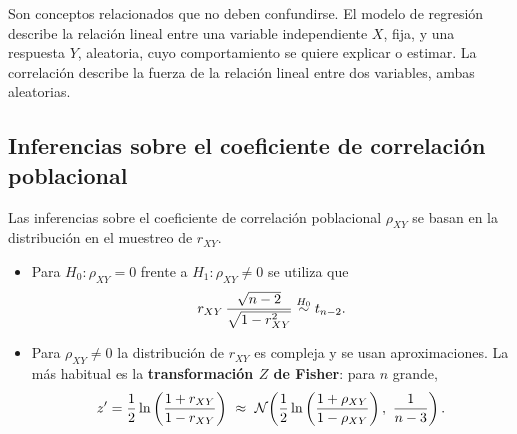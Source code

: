 \begin{nota}
  Son conceptos relacionados que no deben confundirse. El modelo de regresión describe la
  relación lineal entre una variable independiente $X$, fija, y una respuesta $Y$, aleatoria,
  cuyo comportamiento se quiere explicar o estimar. La correlación describe la fuerza de la
  relación lineal entre dos variables, ambas aleatorias.
\end{nota}

\subsection{Inferencias sobre el coeficiente de correlación poblacional}

Las inferencias sobre el coeficiente de correlación poblacional $\rho_{XY}$ se basan en la
distribución en el muestreo de $r_{XY}$.
\begin{itemize}
  \item Para $H_0\colon\rho_{XY}=0$ frente a $H_1\colon\rho_{XY}\neq0$ se utiliza que
    \[
      r_{XY}\,\frac{\sqrt{n-2}}{\sqrt{1-r_{XY}^2}} \overset{H_0}{\sim} t_{n-2} .
    \]
  \item Para $\rho_{XY}\neq0$ la distribución de $r_{XY}$ es compleja y se usan aproximaciones.
    La más habitual es la \textbf{transformación $Z$ de Fisher}: para $n$ grande,
    \[
      z' = \frac12\ln\left(\frac{1+r_{XY}}{1-r_{XY}}\right)
      \ \approx\ \Normal\!\left(\frac12\ln\left(\frac{1+\rho_{XY}}{1-\rho_{XY}}\right),\ \frac{1}{n-3}\right).
    \]
\end{itemize}
